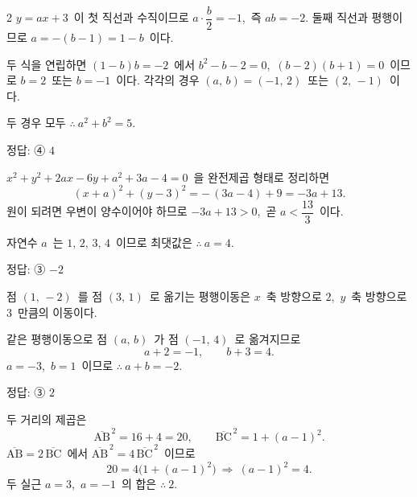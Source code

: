 \documentclass[10pt,fleqn]{article}
\begin{document}
\begin{multicols*}{2}
$y=ax+3$\ 이 첫 직선과 수직이므로 $a\cdot\dfrac{b}{2} = -1$,\ 즉 $ab = -2$. 둘째 직선과 평행이므로 $a = -(b-1) = 1-b$\ 이다.

두 식을 연립하면 $(1-b)b = -2$\ 에서 $b^2 - b - 2 = 0$,\ $(b-2)(b+1) = 0$\ 이므로 $b=2$\ 또는 $b=-1$\ 이다. 각각의 경우 $(a,\,b) = (-1,\,2)$\ 또는 $(2,\,-1)$\ 이다.

두 경우 모두 $\therefore\ a^2 + b^2 = 5$.

\begin{dmanswerbox}
정답: ④ $4$
\end{dmanswerbox}

$x^2 + y^2 + 2ax - 6y + a^2 + 3a - 4 = 0$\ 을 완전제곱 형태로 정리하면
\[ (x+a)^2 + (y-3)^2 = -\,(3a - 4) + 9 = -3a + 13. \]
원이 되려면 우변이 양수이어야 하므로 $-3a + 13 > 0$,\ 곧 $a < \dfrac{13}{3}$\ 이다.

자연수 $a$\ 는 $1,\,2,\,3,\,4$\ 이므로 최댓값은 $\therefore\ a = 4$.

\begin{dmanswerbox}
정답: ③ $-2$
\end{dmanswerbox}

점 $(1,\,-2)$\ 를 점 $(3,\,1)$\ 로 옮기는 평행이동은 $x$\ 축 방향으로 $2$,\ $y$\ 축 방향으로 $3$\ 만큼의 이동이다.

같은 평행이동으로 점 $(a,\,b)$\ 가 점 $(-1,\,4)$\ 로 옮겨지므로
$$a + 2 = -1,\qquad b + 3 = 4.$$
$a = -3$,\ $b = 1$\ 이므로 $\therefore\ a + b = -2$.

\begin{dmanswerbox}
정답: ③ $2$
\end{dmanswerbox}

두 거리의 제곱은
\[ \overline{\mathrm{AB}}^{\,2} = 16 + 4 = 20,\qquad \overline{\mathrm{BC}}^{\,2} = 1 + (a-1)^2. \]
$\overline{\mathrm{AB}} = 2\,\overline{\mathrm{BC}}$\ 에서 $\overline{\mathrm{AB}}^{\,2} = 4\,\overline{\mathrm{BC}}^{\,2}$\ 이므로
\[ 20 = 4\bigl( 1 + (a-1)^2 \bigr) \ \Longrightarrow\ (a-1)^2 = 4. \]
두 실근 $a = 3$,\ $a = -1$\ 의 합은 $\therefore\ 2$.


\end{multicols*}
\end{document}
